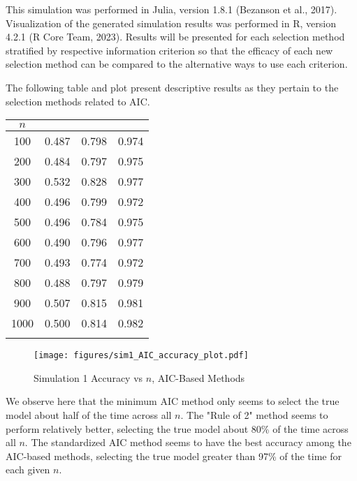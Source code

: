 		This simulation was performed in Julia, version 1.8.1 (Bezanson et al., 2017). Visualization of the generated simulation results was performed in R, version 4.2.1 (R Core Team, 2023).
		Results will be presented for each selection method stratified by respective information criterion so that the efficacy of each new selection method can be compared to the
		alternative ways to use each criterion.

		The following table and plot present descriptive results as they pertain to the selection methods related to AIC.
		\begin{table}[H]
			\centering
			\small\addtolength{\tabcolsep}{-3pt}
			\setlength\extrarowheight{-3pt}
			{
			\begin{tabular}{ c|c|c|c}
			$n$ & \vtop{\hbox{\strut Minimum AIC}\hbox{\strut Accuracy}} & \vtop{\hbox{\strut AIC Rule of 2}\hbox{\strut Accuracy}} & \vtop{\hbox{\strut Standardized AIC} \hbox{\strut Accuracy}} \\
			 \hline
			 100 & 0.487 & 0.798 & 0.974 \\
			 200 & 0.484 & 0.797 & 0.975 \\
			 300 & 0.532 & 0.828 & 0.977 \\
			 400 & 0.496 & 0.799 & 0.972 \\
			 500 & 0.496 & 0.784 & 0.975 \\
			 600 & 0.490 & 0.796 & 0.977 \\
			 700 & 0.493 & 0.774 & 0.972 \\
			 800 & 0.488 & 0.797 & 0.979 \\
			 900 & 0.507 & 0.815 & 0.981 \\
			 1000 & 0.500 & 0.814 & 0.982 \\
			 \Xhline{3\arrayrulewidth}
			\end{tabular}
			}
		\end{table}

		\begin{figure}[H]
			\centering
			\captionsetup{justification=centering}
			\texttt{[image: figures/sim1\_AIC\_accuracy\_plot.pdf]}
			\caption{\label{fig:sim1_aic_accuracy_plot} Simulation 1 Accuracy vs $n$, AIC-Based Methods}
		\end{figure}

		We observe here that the minimum AIC method only seems to select the true model about half of the time across all $n$. The "Rule of 2" method seems to perform relatively better,
		selecting the true model about 80\% of the time across all $n$. The standardized AIC method seems to have the best accuracy among the AIC-based methods, selecting the true model
		greater than 97\% of the time for each given $n$.

